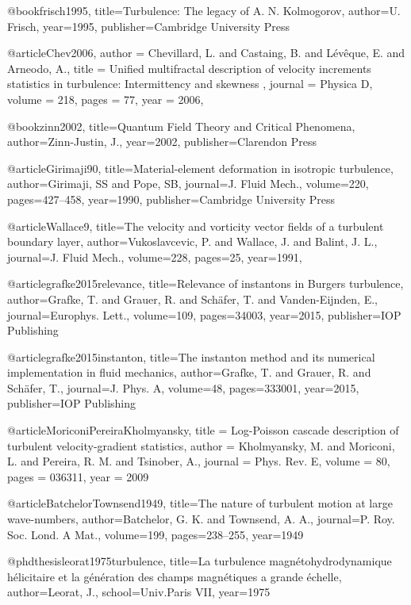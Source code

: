 @book{frisch1995,
  title={{Turbulence: The legacy of A. N. Kolmogorov}},
  author={U. Frisch},
  year={1995},
  publisher={Cambridge University Press}
}

@article{Chev2006,
author = {Chevillard, L. and Castaing, B. and Lévêque, E. and Arneodo, A.},
title = {Unified multifractal description of velocity increments statistics in turbulence: Intermittency and skewness },
journal = {Physica D},
volume = {218},
pages = {77},
year = {2006},
}

@book{zinn2002,
  title={Quantum Field Theory and Critical Phenomena},
  author={Zinn-Justin, J.},
  year=2002,
  publisher={Clarendon Press}
}



@article{Girimaji90,
  title={Material-element deformation in isotropic turbulence},
  author={Girimaji, SS and Pope, SB},
  journal={J. Fluid Mech.},
  volume={220},
  pages={427--458},
  year={1990},
  publisher={Cambridge University Press}
}

@article{Wallace9,
  title={The velocity and vorticity vector fields of a turbulent boundary layer},
  author={Vukoslavcevic, P. and Wallace, J. and Balint, J. L.},
  journal={J. Fluid Mech.},
  volume={228},
  pages={25},
  year={1991},
}

@article{grafke2015relevance,
  title={Relevance of instantons in Burgers turbulence},
  author={Grafke, T. and Grauer, R. and Sch{\"a}fer, T. and Vanden-Eijnden, E.},
  journal={Europhys. Lett.},
  volume={109},
  pages={34003},
  year={2015},
  publisher={IOP Publishing}
}

@article{grafke2015instanton,
  title={The instanton method and its numerical implementation in fluid mechanics},
  author={Grafke, T. and Grauer, R. and Sch{\"a}fer, T.},
  journal={J. Phys. A},
  volume={48},
  pages={333001},
  year={2015},
  publisher={IOP Publishing}
}

@article{MoriconiPereiraKholmyansky,
  title = {Log-Poisson cascade description of turbulent velocity-gradient statistics},
  author = {Kholmyansky, M. and Moriconi, L. and Pereira, R. M. and Tsinober, A.},
  journal = {Phys. Rev. E},
  volume = {80},
  pages = {036311},
  year = {2009}
}

@article{BatchelorTownsend1949,
  title={The nature of turbulent motion at large wave-numbers},
  author={Batchelor, G. K. and Townsend, A. A.},
  journal={P. Roy. Soc. Lond. A Mat.},
  volume={199},
  pages={238--255},
  year={1949}
}

@phdthesis{leorat1975turbulence,
  title={La turbulence magn{\'e}tohydrodynamique h{\'e}licitaire et la g{\'e}n{\'e}ration des champs magn{\'e}tiques a grande {\'e}chelle},
  author={Leorat, J.},
  school={Univ.Paris VII},
  year={1975}
}


